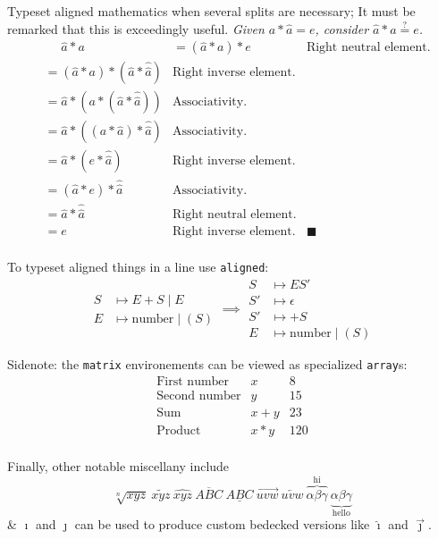 Typeset aligned mathematics when several splits are necessary;
It must be remarked that this is exceedingly useful.
\def\QED{\blacksquare}%
\textit{Given $a*\widehat{a} = e$, consider $\widehat{a}*a \stackrel?= e$.}
\begin{align*}
	&\mathrel{\phantom{=}} \widehat{a}*a
	&= (\widehat{a}*a)*e &\text{Right neutral element.} \\
	&=(\widehat{a}*a)*(\widehat{a}*\widehat{\widehat{a}}) &\text{Right inverse element.} \\
	&= \widehat{a}*(a*(\widehat{a}*\widehat{\widehat{a}})) &\text{Associativity.} \\
	&= \widehat{a}*((a*\widehat{a})*\widehat{\widehat{a}}) &\text{Associativity.} \\
	&= \widehat{a}*(e*\widehat{\widehat{a}}) &\text{Right inverse element.} \\
	&= (\widehat{a}*e)*\widehat{\widehat{a}} &\text{Associativity.} \\
	&= \widehat{a}*\widehat{\widehat{a}} &\text{Right neutral element.} \\
	&= e &\text{Right inverse element.}  &\QED \\
\end{align*}

To typeset aligned things in a line use \texttt{aligned}:
$$
\begin{aligned}
	S &\mapsto E + S \mid E\\
	E &\mapsto \textrm{number} \mid (S)
\end{aligned}
\implies
\begin{aligned}
	S &\mapsto ES'\\
	S' &\mapsto \epsilon\\
	S' &\mapsto +S\\
	E &\mapsto \textrm{number} \mid (S)
\end{aligned}
$$

Sidenote: the \texttt{matrix} environements can be viewed as specialized \texttt{array}s:
$$
\begin{array}{lcr}
	\mbox{First number} & x & 8 \\
	\mbox{Second number} & y & 15 \\
	\mbox{Sum} & x+y & 23 \\
	\mbox{Product} & x*y & 120 \\
\end{array}
$$

Finally, other notable miscellany include
$$
\sqrt[n]{xyz}\ \widetilde{xyz}\ \widehat{xyz}\ \overline{ABC}\ \underline{ABC}\ \overrightarrow{uvw}\ \overleftarrow{uvw}\ \overbrace{\alpha\beta\gamma}^{\text{hi}}\ \underbrace{\alpha\beta\gamma}_{\text{hello}}
$$
\& $\imath$ and $\jmath$ can be used to produce custom bedecked versions like $\hat\imath$ and $\vec\jmath$.

